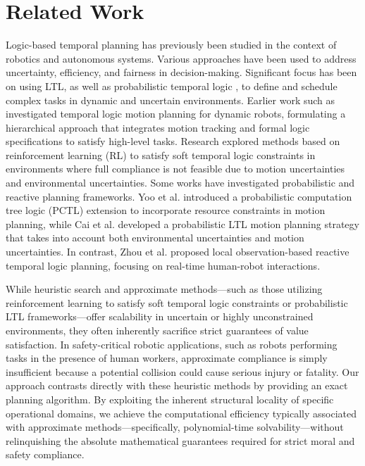 \documentclass[]{jair}
\begin{document}
\section{Related Work}\label{related}

Logic-based temporal planning has previously been studied in the context of robotics and autonomous systems. Various approaches have been used to address uncertainty, efficiency, and fairness in decision-making. Significant focus has been on using LTL, as well as probabilistic temporal logic \cite{konur2011realtimeprobabilistictemporallogics}, to define and schedule complex tasks in dynamic and uncertain environments. 
Earlier work such as \cite{fainekos2009temporal} investigated temporal logic motion planning for dynamic robots, formulating a hierarchical approach that integrates motion tracking and formal logic specifications to satisfy high-level tasks. Research \cite{cai2024reinforcement} explored methods based on reinforcement learning (RL) to satisfy soft temporal logic constraints in environments where full compliance is not feasible due to motion uncertainties and environmental uncertainties.
Some works have investigated probabilistic and reactive planning frameworks. Yoo et al. \cite{yoo2013probabilistic} introduced a probabilistic computation tree logic (PCTL) extension to incorporate resource constraints in motion planning, while Cai et al. \cite{cai2021probabilistic} developed a probabilistic LTL motion planning strategy that takes into account both environmental uncertainties and motion uncertainties. In contrast, Zhou et al. \cite{kan2024local} proposed local observation-based reactive temporal logic planning, focusing on real-time human-robot interactions.

While heuristic search and approximate methods—such as those utilizing reinforcement learning to satisfy soft temporal logic constraints or probabilistic LTL frameworks—offer scalability in uncertain or highly unconstrained environments, they often inherently sacrifice strict guarantees of value satisfaction. In safety-critical robotic applications, such as robots performing tasks in the presence of human workers, approximate compliance is simply insufficient because a potential collision could cause serious injury or fatality. Our approach contrasts directly with these heuristic methods by providing an exact planning algorithm. By exploiting the inherent structural locality of specific operational domains, we achieve the computational efficiency typically associated with approximate methods—specifically, polynomial-time solvability—without relinquishing the absolute mathematical guarantees required for strict moral and safety compliance.
\end{document}
